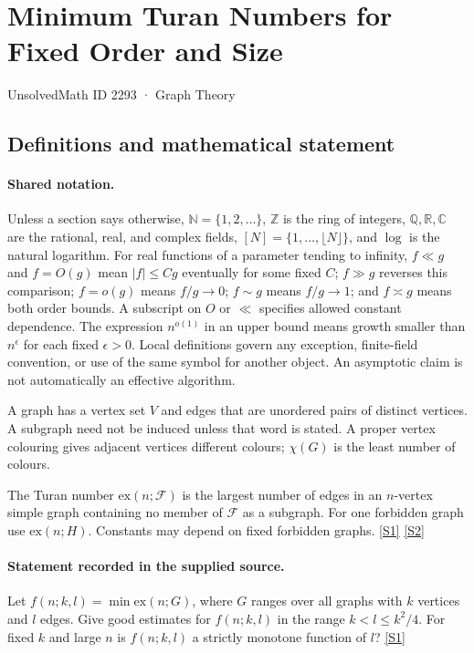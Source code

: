 \documentclass[11pt,a4paper]{article}
\newcommand{\N}{\mathbb{N}}
\newcommand{\Z}{\mathbb{Z}}
\newcommand{\Q}{\mathbb{Q}}
\newcommand{\R}{\mathbb{R}}
\newcommand{\C}{\mathbb{C}}
\newcommand{\sref}[2]{\hyperlink{source:#1:#2}{[S#2]}}
\begin{document}

\setcounter{section}{2292}

\section{Minimum Turan Numbers for Fixed Order and Size}\label{2293}

{\small\sffamily UnsolvedMath ID 2293 · Graph Theory}

\subsection{Definitions and mathematical statement}

\paragraph{Shared notation.}Unless a section says otherwise, $\N=\{1,2,\ldots\}$,
$\Z$ is the ring of integers, $\Q,\R,\C$ are the rational, real, and complex
fields, $[N]=\{1,\ldots,\lfloor N\rfloor\}$, and $\log$ is the natural
logarithm. For real functions of a parameter tending to infinity,
$f\ll g$ and $f=O(g)$ mean $|f|\leq Cg$ eventually for some fixed $C$;
$f\gg g$ reverses this comparison; $f=o(g)$ means $f/g\to0$;
$f\sim g$ means $f/g\to1$; and $f\asymp g$ means both order bounds.
A subscript on $O$ or $\ll$ specifies allowed constant dependence.
The expression $n^{o(1)}$ in an upper bound means growth smaller than
$n^\epsilon$ for each fixed $\epsilon>0$. Local definitions govern any
exception, finite-field convention, or use of the same symbol for another
object. An asymptotic claim is not automatically an effective algorithm.



A graph has a vertex set $V$ and edges that are unordered pairs of distinct vertices. A subgraph need not be induced unless that word is stated. A proper vertex colouring gives adjacent vertices different colours; $\chi(G)$ is the least number of colours.

The Turan number $\mathrm{ex}(n;\mathcal F)$ is the largest number of edges in an $n$-vertex simple graph containing no member of $\mathcal F$ as a subgraph. For one forbidden graph use $\mathrm{ex}(n;H)$. Constants may depend on fixed forbidden graphs. \sref{2293}{1} \sref{2293}{2}

\paragraph{Statement recorded in the supplied source.}
Let $f(n;k,l)=\min \mathrm{ex}(n;G)$, where $G$ ranges over all graphs with $k$ vertices and $l$ edges.
Give good estimates for $f(n;k,l)$ in the range $k<l\leq k^2/4$. For fixed $k$ and large $n$ is $f(n;k,l)$ a strictly monotone function of $l$? \sref{2293}{1}
\end{document}
